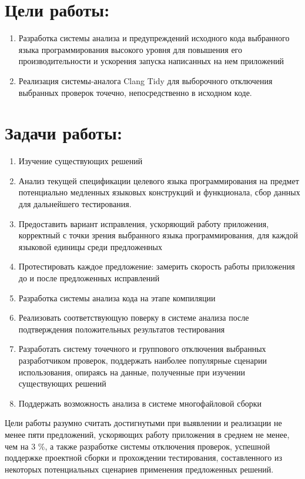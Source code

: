 \documentclass{mipt-thesis-bs}
\begin{document}
\section{Цели работы:}

\begin{enumerate}
    \item Разработка системы анализа и предупреждений исходного кода выбранного языка программирования высокого уровня 
для повышения его производительности и ускорения запуска написанных на нем приложений
    \item Реализация системы-аналога Clang Tidy для выборочного отключения выбранных проверок точечно, непосредственно в исходном коде.
\end{enumerate}

\section{Задачи работы:}

\begin{enumerate}
    \item Изучение существующих решений
    \item Анализ текущей спецификации целевого языка программирования на предмет потенциально медленных языковых конструкций и функционала, 
    сбор данных для дальнейшего тестирования.
    \item Предоставить вариант исправления, ускоряющий работу приложения, корректный с точки 
    зрения выбранного языка программирования, для каждой языковой единицы среди предложенных
    \item Протестировать каждое предложение: замерить скорость работы приложения до и после предложенных исправлений
    \item Разработка системы анализа кода на этапе компиляции
    \item Реализовать соответствующую поверку в системе анализа после подтверждения положительных результатов тестирования
    \item Разработать систему точечного и группового отключения выбранных разработчиком проверок, поддержать наиболее популярные сценарии 
    использования, опираясь на данные, полученные при изучении существующих решений
    \item Поддержать возможность анализа в системе многофайловой сборки

\end{enumerate}

Цели работы разумно считать достигнутыми при выявлении и реализации не менее пяти предложений, ускоряющих работу приложения в среднем не менее, чем на 3 \%, 
а также разработке системы отключения проверок, успешной поддержке проектной сборки и прохождении тестирования, составленного из некоторых 
потенциальных сценариев применения предложенных решений.
\end{document}
